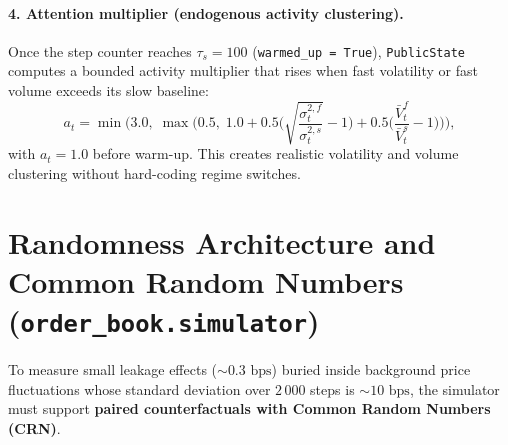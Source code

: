 \documentclass[11pt,a4paper]{article}
\newcommand{\code}[1]{\texttt{#1}}
\begin{document}
\paragraph{4. Attention multiplier (endogenous activity clustering).} Once the step counter reaches
$\tau_s = 100$ (\code{warmed\_up = True}), \code{PublicState} computes a bounded activity multiplier
that rises when fast volatility or fast volume exceeds its slow baseline:
\begin{equation}
  a_t = \min\!\Bigg(3.0,\; \max\!\Bigg(0.5,\;
  1.0 + 0.5\bigg(\sqrt{\frac{\sigma^{2,f}_t}{\sigma^{2,s}_t}} - 1\bigg)
      + 0.5\bigg(\frac{\bar V^{f}_t}{\bar V^{s}_t} - 1\bigg)\Bigg)\Bigg),
\end{equation}
with $a_t = 1.0$ before warm-up. This creates realistic volatility and volume clustering without hard-coding
regime switches.

\section{Randomness Architecture and Common Random Numbers (\code{order\_book.simulator})}
\label{sec:rng}

To measure small leakage effects ($\sim 0.3\text{ bps}$) buried inside background price fluctuations whose
standard deviation over $2\,000$ steps is $\sim 10\text{ bps}$, the simulator must support \textbf{paired
counterfactuals with Common Random Numbers (CRN)}.
\end{document}
